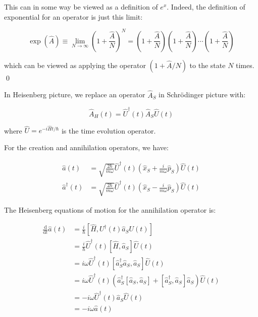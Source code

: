 \documentclass[12pt]{article}
\begin{document}
This can in some way be viewed as a definition of $e^{x}$. Indeed, the definition of exponential for an operator is just this limit:

\begin{equation}
    \exp(\hat{A}) \equiv \lim_{N \to \infty} \left( 1 + \frac{\hat{A}}{N} \right)^{N} = \left( 1 + \frac{\hat{A}}{N} \right) \left( 1 + \frac{\hat{A}}{N} \right) \cdots \left( 1 + \frac{\hat{A}}{N} \right)
\end{equation}

which can be viewed as applying the operator $(1 + \hat{A}/N)$ to the state $N$ times.
\qed


In Heisenberg picture, we replace an operator $\hat{A}_{S}$ in Schr\"{o}dinger picture with:

\begin{equation}
    \hat{A}_{H}(t) = \hat{U}^{\dagger}(t) \hat{A}_{S} \hat{U}(t)
\end{equation}

where $\hat{U} = e^{-i\hat{H}t/\hbar}$ is the time evolution operator.

For the creation and annihilation operators, we have:

\begin{equation}
\begin{split}
\hat{a}(t) &= \sqrt{\frac{2\hbar}{m\omega}} \hat{U}^{\dagger}(t) \left( \hat{x}_{S} + \frac{i}{m\omega} \hat{p}_{S} \right) \hat{U}(t) \\
\hat{a}^{\dagger}(t) &= \sqrt{\frac{2\hbar}{m\omega}} \hat{U}^{\dagger}(t) \left( \hat{x}_{S} - \frac{i}{m\omega} \hat{p}_{S} \right) \hat{U}(t)
\end{split}
\end{equation}

The Heisenberg equations of motion for the annihilation operator is:

\begin{equation}
\begin{split}
\frac{\mathrm{d}}{\mathrm{d}t} \hat{a}(t) &= \frac{i}{\hbar} [\hat{H}, U^{\dagger}(t) \hat{a}_{S} U(t)] \\
&= \frac{i}{\hbar} \hat{U}^{\dagger}(t) [\hat{H}, \hat{a}_{S}] \hat{U}(t) \\
&= i \omega \hat{U}^{\dagger}(t) [\hat{a}_{S}^{\dagger} \hat{a}_{S}, \hat{a}_{S}] \hat{U}(t) \\
&= i \omega \hat{U}^{\dagger}(t) \left( \hat{a}_{S}^{\dagger} [\hat{a}_{S}, \hat{a}_{S}] + [\hat{a}_{S}^{\dagger}, \hat{a}_{S}] \hat{a}_{S} \right) \hat{U}(t) \\
&= -i \omega \hat{U}^{\dagger}(t) \hat{a}_{S} \hat{U}(t) \\
&= -i \omega \hat{a}(t)
\end{split}
\end{equation}
\end{document}
